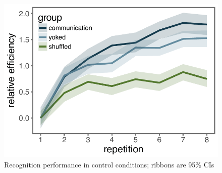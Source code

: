 \documentclass[10pt,letterpaper]{article}
\begin{document}






\begin{figure}
\includegraphics[width=\linewidth]{figures/recog_BIS_timeseries.pdf}
\caption{Recognition performance in control conditions; ribbons are 95\% CIs}
\label{recog_bis}
\end{figure}
\end{document}

